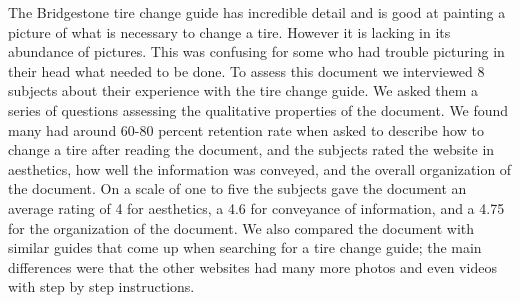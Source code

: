 \documentclass[12pt,A4paper]{article}
\begin{document}
	The Bridgestone tire change guide has incredible detail and is good at painting a picture of what is necessary to change a tire. However it is lacking in its abundance of pictures. This was confusing for some who had trouble picturing in their head what needed to be done. To assess this document we interviewed 8 subjects about their experience with the tire change guide. We asked them a series of questions assessing the qualitative properties of the document. We found many had around 60-80 percent retention rate when asked to describe how to change a tire after reading the document, and the subjects rated the website in aesthetics, how well the information was conveyed, and the overall organization of the document. On a scale of one to five the subjects gave the document an average rating of 4 for aesthetics, a 4.6 for conveyance of information, and a 4.75 for the organization of the document. We also compared the document with similar guides that come up when searching for a tire change guide; the main differences were that the other websites had many more photos and even videos with step by step instructions.
	
	\clearpage
	
	\setcounter{page}{2}
	
	\tableofcontents

	
	\renewcommand\listfigurename{List of Illustrations}
	\listoffigures

	\clearpage
\end{document}
